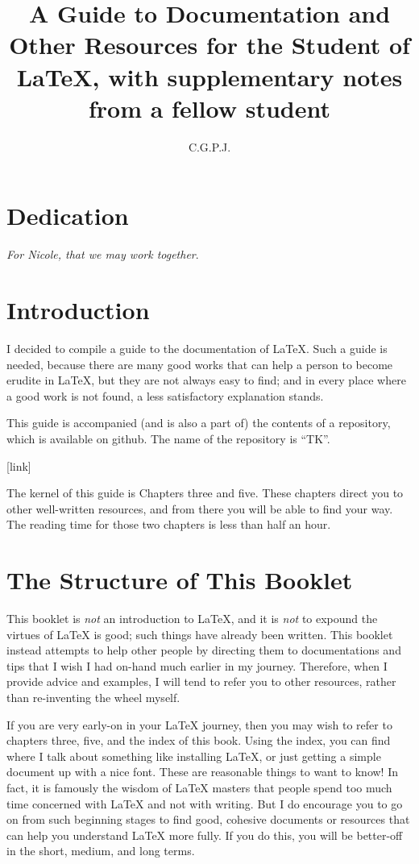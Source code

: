 \documentclass[12pt, oneside]{memoir}
\title{A Guide to Documentation and Other Resources for the Student of \LaTeX{}, with supplementary notes from a fellow student}
\author{C.\thinspace G.\thinspace P.\thinspace J.\thinspace}
\begin{document}
\maketitle
\thispagestyle{empty}

\raggedright

\chapter*{Dedication}
\emph{For Nicole, that we may work together}.

\chapter{Introduction}
I decided to compile a guide to the documentation of \LaTeX{}. Such a guide is needed, because there are many good works that can help a person to become erudite in \LaTeX{}, but they are not always easy to find; and in every place where a good work is not found, a less satisfactory explanation stands.

This guide is accompanied (and is also a part of) the contents of a repository, which is available on github. The name of the repository is ``TK''.

[link]

The kernel of this guide is Chapters three and five. These chapters direct you to other well-written resources, and from there you will be able to find your way. The reading time for those two chapters is less than half an hour.

\chapter{The Structure of This Booklet}
This booklet is \emph{not} an introduction to \LaTeX{}, and it is \emph{not} to expound the virtues of \LaTeX{} is good; such things have already been written. This booklet instead attempts to help other people by directing them to documentations and tips that I wish I had on-hand much earlier in my journey. Therefore, when I provide advice and examples, I will tend to refer you to other resources, rather than re-inventing the wheel myself.

If you are very early-on in your \LaTeX{} journey, then you may wish to refer to chapters three, five, and the index of this book. Using the index, you can find where I talk about something like installing \LaTeX{}, or just getting a simple document up with a nice font. These are reasonable things to want to know! In fact, it is famously the wisdom of \LaTeX{} masters that people spend too much time concerned with \LaTeX{} and not with writing. But I do encourage you to go on from such beginning stages to find good, cohesive documents or resources that can help you understand \LaTeX{} more fully. If you do this, you will be better-off in the short, medium, and long terms.
\end{document}
